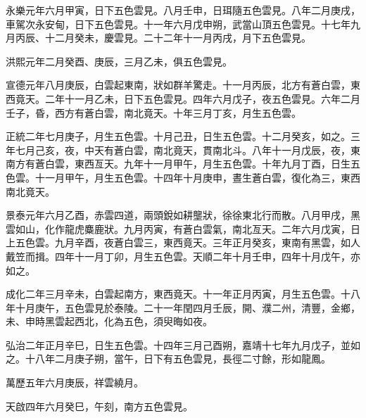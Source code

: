 \begin{pinyinscope}
永樂元年六月甲寅，日下五色雲見。八月壬申，日珥隨五色雲見。八年二月庚戌，車駕次永安甸，日下五色雲見。十一年六月戊申朔，武當山頂五色雲見。十七年九月丙辰、十二月癸未，慶雲見。二十二年十一月丙戌，月下五色雲見。

洪熙元年二月癸酉、庚辰，三月乙未，俱五色雲見。

宣德元年八月庚辰，白雲起東南，狀如群羊驚走。十一月丙辰，北方有蒼白雲，東西竟天。二年十一月乙未，日下五色雲見。四年六月戊子，夜五色雲見。六年二月壬子，昏，西方有蒼白雲，南北竟天。十年三月丁亥，月生五色雲。

正統二年七月庚子，月生五色雲。十月己丑，日生五色雲。十二月癸亥，如之。三年七月己亥，夜，中天有蒼白雲，南北竟天，貫南北斗。八年十一月戊辰，夜，東南方有蒼白雲，東西亙天。九年十一月甲午，月生五色雲。十年九月丁酉，日生五色雲。十一月甲午，月生五色雲。十四年十月庚申，晝生蒼白雲，復化為三，東西南北竟天。

景泰元年六月乙酉，赤雲四道，兩頭銳如耕壟狀，徐徐東北行而散。八月甲戌，黑雲如山，化作龍虎麋鹿狀。九月丙寅，有蒼白雲氣，南北亙天。二年六月戊寅，日上五色雲。九月辛酉，夜蒼白雲三，東西竟天。三年正月癸亥，東南有黑雲，如人戴笠而揖。四年十一月丁卯，月生五色雲。天順二年十月壬申，四年十月戊午，亦如之。

成化二年三月辛未，白雲起南方，東西竟天。十一年正月丙寅，月生五色雲。十八年十月庚午，五色雲見於泰陵。二十一年閏四月壬辰，開、濮二州，清豐，金鄉，未、申時黑雲起西北，化為五色，須臾晦如夜。

弘治二年正月辛巳，日生五色雲。十四年三月己酉朔，嘉靖十七年九月戊子，並如之。十八年二月庚子朔，當午，日下有五色雲見，長徑二寸餘，形如龍鳳。

萬歷五年六月庚辰，祥雲繞月。

天啟四年六月癸巳，午刻，南方五色雲見。


\end{pinyinscope}